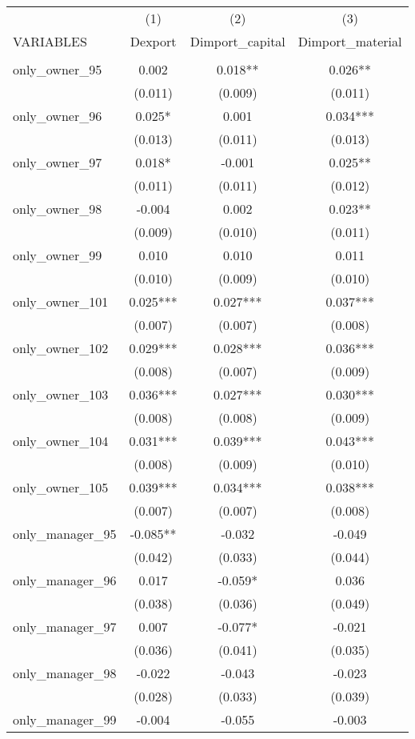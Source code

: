 \begin{tabular}{lccc} \hline
 & (1) & (2) & (3) \\
VARIABLES & Dexport & Dimport\_capital & Dimport\_material \\ \hline
 &  &  &  \\
only\_owner\_95 & 0.002 & 0.018** & 0.026** \\
 & (0.011) & (0.009) & (0.011) \\
only\_owner\_96 & 0.025* & 0.001 & 0.034*** \\
 & (0.013) & (0.011) & (0.013) \\
only\_owner\_97 & 0.018* & -0.001 & 0.025** \\
 & (0.011) & (0.011) & (0.012) \\
only\_owner\_98 & -0.004 & 0.002 & 0.023** \\
 & (0.009) & (0.010) & (0.011) \\
only\_owner\_99 & 0.010 & 0.010 & 0.011 \\
 & (0.010) & (0.009) & (0.010) \\
only\_owner\_101 & 0.025*** & 0.027*** & 0.037*** \\
 & (0.007) & (0.007) & (0.008) \\
only\_owner\_102 & 0.029*** & 0.028*** & 0.036*** \\
 & (0.008) & (0.007) & (0.009) \\
only\_owner\_103 & 0.036*** & 0.027*** & 0.030*** \\
 & (0.008) & (0.008) & (0.009) \\
only\_owner\_104 & 0.031*** & 0.039*** & 0.043*** \\
 & (0.008) & (0.009) & (0.010) \\
only\_owner\_105 & 0.039*** & 0.034*** & 0.038*** \\
 & (0.007) & (0.007) & (0.008) \\
only\_manager\_95 & -0.085** & -0.032 & -0.049 \\
 & (0.042) & (0.033) & (0.044) \\
only\_manager\_96 & 0.017 & -0.059* & 0.036 \\
 & (0.038) & (0.036) & (0.049) \\
only\_manager\_97 & 0.007 & -0.077* & -0.021 \\
 & (0.036) & (0.041) & (0.035) \\
only\_manager\_98 & -0.022 & -0.043 & -0.023 \\
 & (0.028) & (0.033) & (0.039) \\
only\_manager\_99 & -0.004 & -0.055 & -0.003 \\

\end{tabular}
